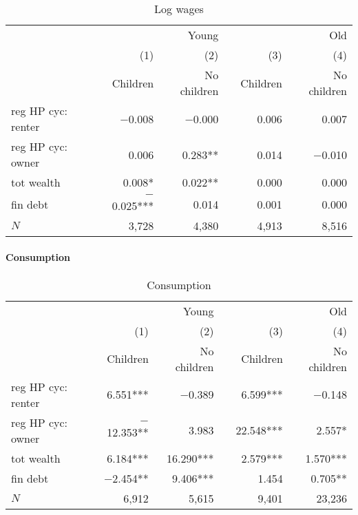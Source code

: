 \documentclass[10pt]{article}
\theoremstyle{definition}
\theoremstyle{remark}
\begin{document}
\begin{table}[pt]
    \centering
    \caption{Log wages}
    \label{tab:wages}
    \begin{tabular}{lrrlrr}
        \toprule
        & \multicolumn{2}{r}{Young} &  & \multicolumn{2}{r}{Old} \\
        \cmidrule{2-3} \cmidrule{5-6} 
        & (1) & (2) &  & (3) & (4) \\
        & Children & No children &  & Children & No children \\
        \midrule
        reg HP cyc: renter & $-$0.008\phantom{***} & $-$0.000\phantom{***} &  & 0.006\phantom{***} & 0.007\phantom{***} \\
        reg HP cyc: owner & 0.006\phantom{***} & 0.283**\phantom{*} &  & 0.014\phantom{***} & $-$0.010\phantom{***} \\
        tot wealth & 0.008*\phantom{**} & 0.022**\phantom{*} &  & 0.000\phantom{***} & 0.000\phantom{***} \\
        fin debt & $-$0.025*** & 0.014\phantom{***} &  & 0.001\phantom{***} & 0.000\phantom{***} \\
        \midrule
        $N$ & 3,728\phantom{***} & 4,380\phantom{***} &  & 4,913\phantom{***} & 8,516\phantom{***} \\
        \bottomrule
    \end{tabular}
\end{table}

\paragraph{Consumption} 

\begin{table}[pt]
    \centering
    \caption{Consumption}
    \label{tab:consumption}
    \begin{tabular}{lrrlrr}
        \toprule
        & \multicolumn{2}{r}{Young} &  & \multicolumn{2}{r}{Old} \\
        \cmidrule{2-3} \cmidrule{5-6} 
        & (1) & (2) &  & (3) & (4) \\
        & Children & No children &  & Children & No children \\
        \midrule
        reg HP cyc: renter & 6.551*** & $-$0.389\phantom{***} &  & 6.599*** & $-$0.148\phantom{***} \\
        reg HP cyc: owner & $-$12.353**\phantom{*} & 3.983\phantom{***} &  & 22.548*** & 2.557*\phantom{**} \\
        tot wealth & 6.184*** & 16.290*** &  & 2.579*** & 1.570*** \\
        fin debt & $-$2.454**\phantom{*} & 9.406*** &  & 1.454\phantom{***} & 0.705**\phantom{*} \\
        \midrule
        $N$ & 6,912\phantom{***} & 5,615\phantom{***} &  & 9,401\phantom{***} & 23,236\phantom{***} \\
        \bottomrule
    \end{tabular}
\end{table}
\end{document}
